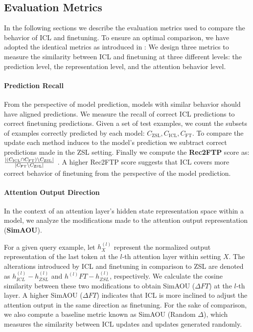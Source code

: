 \subsection{Evaluation Metrics}

In the following sections we describe the evaluation metrics used to compare the behavior of ICL and finetuning.
To ensure an optimal comparison, we have adopted the identical metrics as introduced in \cite{dai2023gpt}:
We design three metrics to measure the similarity between ICL and finetuning at three different levels: the prediction level, the representation level, and the attention behavior level. 

\paragraph{Prediction Recall}

From the perspective of model prediction, models with similar behavior should have aligned predictions.
We measure the recall of correct ICL predictions to correct finetuning predictions.
Given a set of test examples, we count the subsets of examples correctly predicted by each model: $C_{\text{ZSL}}, C_{\text{ICL}}, C_{\text{FT}}$.
To compare the update each method induces to the model's prediction we subtract correct predictions made in the ZSL setting.
Finally we compute the \textbf{Rec2FTP} score as: $\frac{ \left| \left( C_{\text{ICL}} \cap C_{\text{FT}} \right) \setminus C_{\text{ZSL}} \right| }{ \left| C_{\text{FT}} \setminus C_{\text{ZSL}} \right| }$ .
A higher Rec2FTP score suggests that ICL covers more correct behavior of finetuning from the perspective of the model prediction.


\paragraph{Attention Output Direction}
In the context of an attention layer's hidden state representation space within a model, we analyze the modifications made to the attention output representation (\textbf{SimAOU}).

For a given query example, let $h^{(l)}_X$ represent the normalized output representation of the last token at the $l$-th attention layer within setting $X$. The alterations introduced by ICL and finetuning in comparison to ZSL are denoted as $h^{(l)}_{ICL} - h^{(l)}_{ZSL}$ and $h^{(l)}{FT} - h^{(l)}_{ZSL}$, respectively. We calculate the cosine similarity between these two modifications to obtain SimAOU ($\Delta FT$) at the $l$-th layer. A higher SimAOU ($\Delta FT$) indicates that ICL is more inclined to adjust the attention output in the same direction as finetuning.
For the sake of comparison, we also compute a baseline metric known as SimAOU (Random $\Delta$), which measures the similarity between ICL updates and updates generated randomly.

